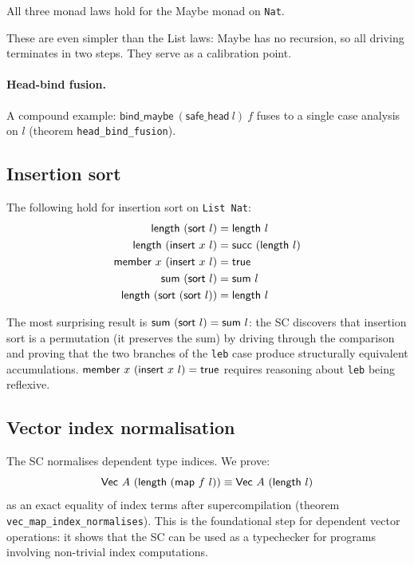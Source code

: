 \begin{theorem}
All three monad laws hold for the Maybe monad on \texttt{Nat}.
\end{theorem}

\noindent
These are even simpler than the List laws: Maybe has no recursion, so all
driving terminates in two steps.  They serve as a calibration point.

\paragraph{Head-bind fusion.}
A compound example: $\mathsf{bind\_maybe}\ (\mathsf{safe\_head}\ l)\ f$
fuses to a single case analysis on $l$ (theorem \texttt{head\_bind\_fusion}).

\subsection{Insertion sort}

\begin{theorem}
The following hold for insertion sort on \texttt{List Nat}:
\begin{align*}
  \mathsf{length}\ (\mathsf{sort}\ l) &= \mathsf{length}\ l \\
  \mathsf{length}\ (\mathsf{insert}\ x\ l) &= \mathsf{succ}\ (\mathsf{length}\ l) \\
  \mathsf{member}\ x\ (\mathsf{insert}\ x\ l) &= \mathsf{true} \\
  \mathsf{sum}\ (\mathsf{sort}\ l) &= \mathsf{sum}\ l \\
  \mathsf{length}\ (\mathsf{sort}\ (\mathsf{sort}\ l)) &= \mathsf{length}\ l
\end{align*}
\end{theorem}

\noindent
The most surprising result is $\mathsf{sum}\ (\mathsf{sort}\ l) = \mathsf{sum}\ l$:
the SC discovers that insertion sort is a permutation (it preserves the sum)
by driving through the comparison and proving that the two branches of the
\texttt{leb} case produce structurally equivalent accumulations.
$\mathsf{member}\ x\ (\ins\ x\ l) = \mathsf{true}$ requires reasoning
about \texttt{leb} being reflexive.

\subsection{Vector index normalisation}

The SC normalises dependent type indices.  We prove:
\[
  \mathsf{Vec}\ A\ (\mathsf{length}\ (\mathsf{map}\ f\ l)) \equiv \mathsf{Vec}\ A\ (\mathsf{length}\ l)
\]
as an exact equality of index terms after supercompilation (theorem
\texttt{vec\_map\_index\_normalises}).  This is the foundational step for
dependent vector operations: it shows that the SC can be used as a typechecker
for programs involving non-trivial index computations.

